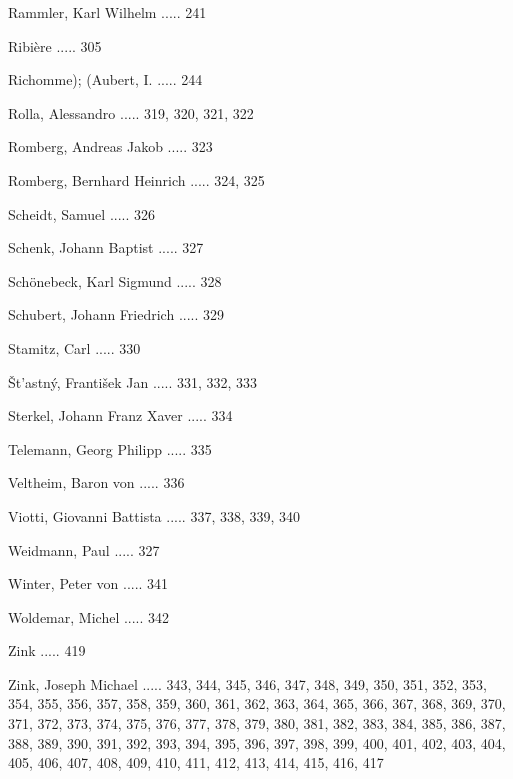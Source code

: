 \documentclass[twocolumn]{book}
\begin{document}
\newline 
Rammler, Karl Wilhelm ..... 241

\newline 
Ribière ..... 305

\newline 
Richomme); (Aubert, I. ..... 244

\newline 
Rolla, Alessandro ..... 319, 320, 321, 322

\newline 
Romberg, Andreas Jakob ..... 323

\newline 
Romberg, Bernhard Heinrich ..... 324, 325

\newline 
Scheidt, Samuel ..... 326

\newline 
Schenk, Johann Baptist ..... 327

\newline 
Schönebeck, Karl Sigmund ..... 328

\newline 
Schubert, Johann Friedrich ..... 329

\newline 
Stamitz, Carl ..... 330

\newline 
Št'astný, František Jan ..... 331, 332, 333

\newline 
Sterkel, Johann Franz Xaver ..... 334

\newline 
Telemann, Georg Philipp ..... 335

\newline 
Veltheim, Baron von ..... 336

\newline 
Viotti, Giovanni Battista ..... 337, 338, 339, 340

\newline 
Weidmann, Paul ..... 327

\newline 
Winter, Peter von ..... 341

\newline 
Woldemar, Michel ..... 342

\newline 
Zink ..... 419

\newline 
Zink, Joseph Michael ..... 343, 344, 345, 346, 347, 348, 349, 350, 351, 352, 353, 354, 355, 356, 357, 358, 359, 360, 361, 362, 363, 364, 365, 366, 367, 368, 369, 370, 371, 372, 373, 374, 375, 376, 377, 378, 379, 380, 381, 382, 383, 384, 385, 386, 387, 388, 389, 390, 391, 392, 393, 394, 395, 396, 397, 398, 399, 400, 401, 402, 403, 404, 405, 406, 407, 408, 409, 410, 411, 412, 413, 414, 415, 416, 417
    \clearpage  
\end{document}
